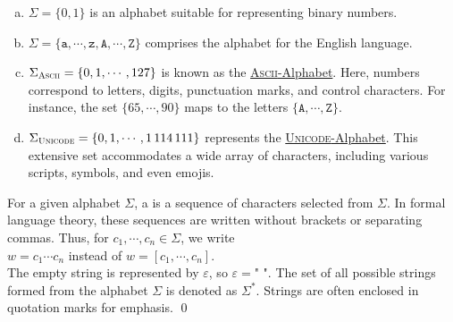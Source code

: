 \examplesEng
\begin{enumerate}[(a)]
\item \( \Sigma = \{ 0, 1 \} \) is an alphabet suitable for representing binary numbers.
\item \( \Sigma = \{ \mathtt{a}, \cdots, \mathtt{z}, \mathtt{A}, \cdots, \mathtt{Z} \} \) comprises the alphabet for the English language.
\item \( \Sigma_{\textsc{\scriptsize Ascii}} = \{ 0, 1, \cdots, 127 \} \) is known as the
      \href{http://en.wikipedia.org/wiki/ASCII}{\textsc{Ascii}-Alphabet}.  Here,
      numbers correspond to letters, digits, punctuation marks, and control characters. For instance, the set
      \( \{ 65, \cdots, 90 \} \) maps to the letters \( \{ \mathtt{A}, \cdots, \mathtt{Z} \} \).
\item \( \Sigma_{\textsc{\scriptsize Unicode}} = \{ 0, 1, \cdots, 1\,114\,111 \} \) represents the
      \href{https://en.wikipedia.org/wiki/Unicode}{\textsc{Unicode}-Alphabet}. 
      This extensive set accommodates a wide array of characters, including various scripts, symbols, and even emojis. 
\eox
\end{enumerate}

\begin{Definition}[Strings]
For a given alphabet \( \Sigma \), a   is a sequence of characters selected from \( \Sigma \). In formal language theory, these sequences are written without brackets or separating commas. Thus, for \( c_1, \cdots, c_n \in \Sigma \), we write
\\[0.2cm]
\hspace*{1.3cm}
\( w = c_1 \cdots c_n \) \quad instead of \quad \( w = [c_1, \cdots, c_n] \).
\\[0.2cm]
The empty string is represented by \( \varepsilon \), \index{\( \varepsilon \)} so \( \varepsilon = \texttt{" "} \).
The set of all possible strings formed from the alphabet \( \Sigma \) is denoted as \( \Sigma^* \). \index{\( \Sigma^* \)} Strings are often enclosed in quotation marks for emphasis.
\qed
\end{Definition}

